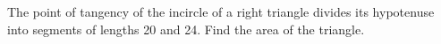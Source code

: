 The point of tangency of the incircle of a right triangle divides its hypotenuse into segments of lengths 20 and 24. Find the area of the triangle.
